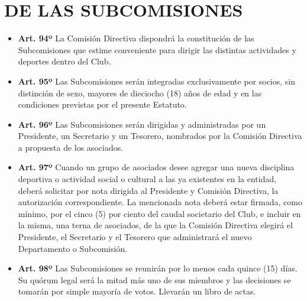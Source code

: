 \documentclass[]{book}
\providecommand{\tightlist}{%
  \setlength{\itemsep}{0pt}\setlength{\parskip}{0pt}}
\begin{document}
\hypertarget{cap20}{%
\chapter{DE LAS SUBCOMISIONES}\label{cap20}}

\begin{itemize}
\tightlist
\item
  \textbf{Art. 94º}
  La Comisión Directiva dispondrá la constitución de las Subcomisiones que estime conveniente para dirigir las distintas actividades y deportes dentro del Club.
\end{itemize}

\begin{itemize}
\tightlist
\item
  \textbf{Art. 95º}
  Las Subcomisiones serán integradas exclusivamente por socios, sin distinción de sexo, mayores de dieciocho (18) años de edad y en las condiciones previstas por el presente Estatuto.
\end{itemize}

\begin{itemize}
\tightlist
\item
  \textbf{Art. 96º}
  Las Subcomisiones serán dirigidas y administradas por un Presidente, un Secretario y un Tesorero, nombrados por la Comisión Directiva a propuesta de los asociados.
\end{itemize}

\begin{itemize}
\tightlist
\item
  \textbf{Art. 97º}
  Cuando un grupo de asociados desee agregar una nueva disciplina deportiva o actividad social o cultural a las ya existentes en la entidad, deberá solicitar por nota dirigida al Presidente y Comisión Directiva, la autorización correspondiente. La mencionada nota deberá estar firmada, como mínimo, por el cinco (5) por ciento del caudal societario del Club, e incluir en la misma, una terna de asociados, de la que la Comisión Directiva elegirá el Presidente, el Secretario y el Tesorero que administrará el nuevo Departamento o Subcomisión.
\end{itemize}

\begin{itemize}
\tightlist
\item
  \textbf{Art. 98º}
  Las Subcomisiones se reunirán por lo menos cada quince (15) días. Su quórum legal será la mitad más uno de sus miembros y las decisiones se tomarán por simple mayoría de votos. Llevarán un libro de actas.
\end{itemize}
\end{document}
